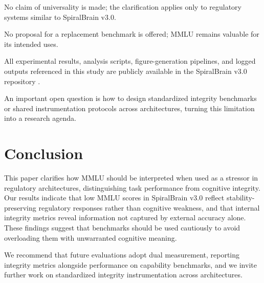 \documentclass[12pt,a4paper]{article}
\begin{document}
No claim of universality is made; the clarification applies only to regulatory systems similar to SpiralBrain v3.0.

No proposal for a replacement benchmark is offered; MMLU remains valuable for its intended uses.

All experimental results, analysis scripts, figure-generation pipelines, and logged outputs referenced in this study are publicly available in the SpiralBrain v3.0 repository \cite{SpiralBrainV3}.

An important open question is how to design standardized integrity benchmarks or shared instrumentation protocols across architectures, turning this limitation into a research agenda.

\section{Conclusion}

This paper clarifies how MMLU should be interpreted when used as a stressor in regulatory architectures, distinguishing task performance from cognitive integrity. Our results indicate that low MMLU scores in SpiralBrain v3.0 reflect stability-preserving regulatory responses rather than cognitive weakness, and that internal integrity metrics reveal information not captured by external accuracy alone. These findings suggest that benchmarks should be used cautiously to avoid overloading them with unwarranted cognitive meaning.

We recommend that future evaluations adopt dual measurement, reporting integrity metrics alongside performance on capability benchmarks, and we invite further work on standardized integrity instrumentation across architectures.



\end{document}
